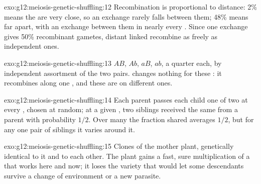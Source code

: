 \begin{solution}{exo:g12:meiosis-genetic-shuffling:12}
Recombination is proportional to distance: 2\% means the  are
very close, so an exchange rarely falls between them; 48\% means far
apart, with an exchange between them in nearly every . Since
one exchange gives 50\% recombinant gametes, distant linked 
recombine as freely as independent ones.
\end{solution}

\begin{solution}{exo:g12:meiosis-genetic-shuffling:13}
$AB$, $Ab$, $aB$, $ab$, a quarter each, by independent assortment of
the two pairs.  changes nothing for these : it
recombines  along one , and these are on different
ones.
\end{solution}

\begin{solution}{exo:g12:meiosis-genetic-shuffling:14}
Each parent passes each child one of two  at every , chosen
at random; at a given , two siblings received the same  from
a parent with probability $1/2$. Over many  the fraction shared
averages $1/2$, but for any one pair of siblings it varies around it.
\end{solution}

\begin{solution}{exo:g12:meiosis-genetic-shuffling:15}
Clones of the mother plant, genetically identical to it and to each
other. The plant gains a fast, sure multiplication of a  that
works here and now; it loses the variety that would let some
descendants survive a change of environment or a new parasite.
\end{solution}

